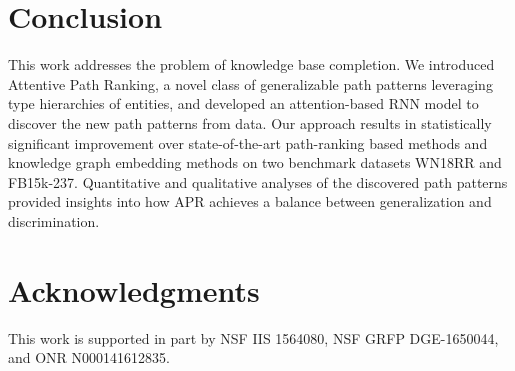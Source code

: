 \documentclass[letterpaper]{article} %
\begin{document}

\section{Conclusion}
This work addresses the problem of knowledge base completion.  We introduced Attentive Path Ranking, a novel class of generalizable path patterns leveraging type hierarchies of entities, and developed an attention-based RNN model to discover the new path patterns from data. Our approach results in statistically significant improvement over state-of-the-art path-ranking based methods and knowledge graph embedding methods on two benchmark datasets WN18RR and FB15k-237. Quantitative and qualitative analyses of the discovered path patterns provided insights into how APR achieves a balance between generalization and discrimination.

\section{ Acknowledgments}
This work is supported in part by NSF IIS 1564080, NSF GRFP DGE-1650044, and ONR N000141612835.



\end{document}
